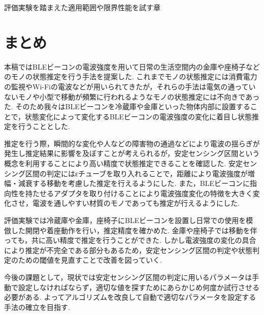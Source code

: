 \documentclass[Japanese]{dicomopapers}
\begin{document}
評価実験を踏まえた適用範囲や限界性能を試す章




\section{まとめ}
本稿ではBLEビーコンの電波強度を用いて日常の生活空間内の金庫や座椅子などのモノの状態推定を行う手法を提案した.
これまでモノの状態推定には消費電力の監視やWi-Fiの電波などが用いられてきたが，それらの手法は電気の通っていないモノや小型で移動が頻繁に行われるようなモノの状態推定には不向きであった.
そのため我々はBLEビーコンを冷蔵庫や金庫といった物体内部に設置することで，状態変化によって変化するBLEビーコンの電波強度の変化に着目し状態推定を行うこととした.

推定を行う際，瞬間的な変化や人などの障害物の通過などにより電波の揺らぎが発生し推定結果に影響を及ぼすことが考えられるが，安定センシング区間という概念を利用することにより高い精度で状態推定できることを確認した.
安定センシング区間の判定にはεチューブを取り入れることで，距離により電波強度が増幅・減衰する移動を考慮した推定を行えるようにした.
また，BLEビーコンに指向性を持たせるアダプタを取り付けることにより電波強度変化の特徴を大きく変化させ，電波を通しやすい材質のモノであっても推定が行えるようにした.

評価実験では冷蔵庫や金庫，座椅子にBLEビーコンを設置し日常での使用を模倣した開閉や着座動作を行い，推定精度を確かめた.
金庫や座椅子では移動を伴っても，共に高い精度で推定を行うことができた.
しかし電波強度の変化の具合により推定が不完全である部分もあるため，安定センシング区間の判定や状態判定のための閾値を見直すことで改善を図っていく.

今後の課題として，現状では安定センシング区間の判定に用いるパラメータは手動で設定しなければならず，適切な値を探すためにあらかじめ何度か試行させる必要がある.
よってアルゴリズムを改良して自動で適切なパラメータを設定する手法の確立を目指す.


\end{document}
